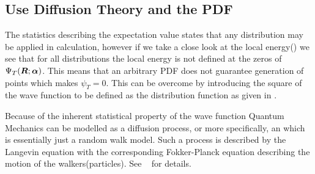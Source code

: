     \subsection{Use Diffusion Theory and the PDF\label{susec:diffTHpdf}}
        The statistics describing the expectation value states that any
        distribution may be applied in calculation, however if we take a close
        look at the local energy() we see that for all
        distributions the local energy is not defined at the zeros of ${\Psi}_T(\boldsymbol{{R}};\boldsymbol{{\alpha}})$.
        This means that an arbitrary PDF does not guarantee generation of
        points which makes $\psi_T=0$. This can be overcome by introducing the
        square of the wave function to be defined as the distribution function
        as given in .

        Because of the inherent statistical property of the wave function
        Quantum Mechanics can be modelled as a diffusion process, or more
        specifically, an  which is
        essentially just a random walk model. Such a process is described by
        the Langevin equation with the corresponding Fokker-Planck equation
        describing the motion of the walkers(particles). See ~\cite{numstoch}
        for details.

